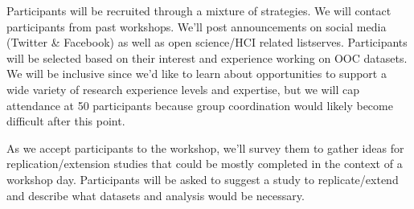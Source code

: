 Participants will be recruited through a mixture of strategies.  We will contact participants from past workshops\cite{wiggins14quality, morgan15advancing, goggins14ocdata}.  We'll post announcements on social media (Twitter \& Facebook) as well as open science/HCI related listserves.  Participants will be selected based on their interest and experience working on OOC datasets.  We will be inclusive since we'd like to learn about opportunities to support a wide variety of research experience levels and expertise, but we will cap attendance at 50 participants because group coordination would likely become difficult after this point.

As we accept participants to the workshop, we'll survey them to gather ideas for replication/extension studies that could be mostly completed in the context of a workshop day.  Participants will be asked to suggest a study to replicate/extend and describe what datasets and analysis would be necessary.
